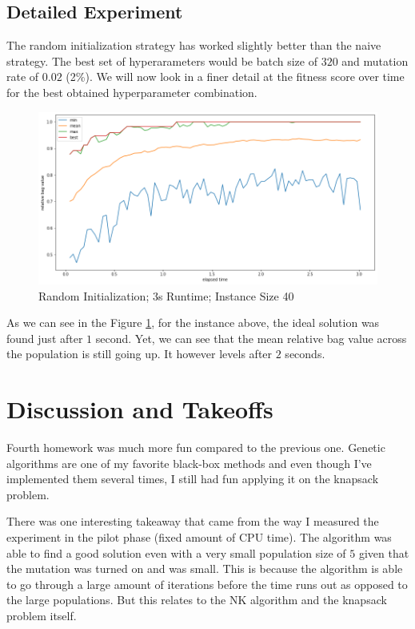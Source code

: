 \documentclass[a4paper,10pt]{article}
\begin{document}
\subsection{Detailed Experiment}

The random initialization strategy has worked slightly better than the naive strategy. The best set of hyperarameters would be batch size of $320$ and mutation rate of $0.02$ (2\%). We will now look in a finer detail at the fitness score over time for the best obtained hyperparameter combination.

\begin{figure}[!htb]
	\centering
  	\includegraphics[width=\textwidth]{images/detail.png}
	\caption{Random Initialization; 3s Runtime; Instance Size 40}
	\label{detail}
\end{figure}

As we can see in the Figure \ref{detail}, for the instance above, the ideal solution was found just after $1$ second. Yet, we can see that the mean relative bag value across the population is still going up. It however levels after $2$ seconds.

\clearpage
\section{Discussion and Takeoffs}

Fourth homework was much more fun compared to the previous one. Genetic algorithms are one of my favorite black-box methods and even though I've implemented them several times, I still had fun applying it on the knapsack problem.

There was one interesting takeaway that came from the way I measured the experiment in the pilot phase (fixed amount of CPU time). The algorithm was able to find a good solution even with a very small population size of $5$ given that the mutation was turned on and was small. This is because the algorithm is able to go through a large amount of iterations before the time runs out as opposed to the large populations. But this relates to the NK algorithm and the knapsack problem itself.
\end{document}
